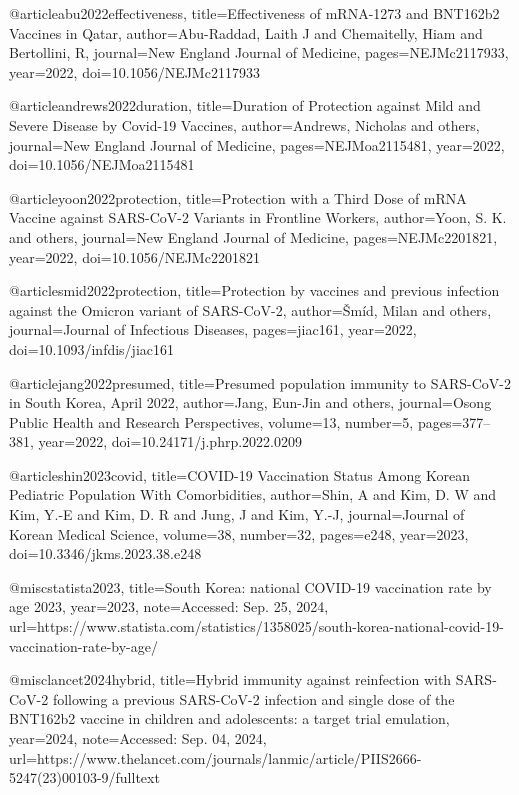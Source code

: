 @article{abu2022effectiveness,
	title={Effectiveness of mRNA-1273 and BNT162b2 Vaccines in Qatar},
	author={Abu-Raddad, Laith J and Chemaitelly, Hiam and Bertollini, R},
	journal={New England Journal of Medicine},
	pages={NEJMc2117933},
	year={2022},
	doi={10.1056/NEJMc2117933}
}

@article{andrews2022duration,
	title={Duration of Protection against Mild and Severe Disease by Covid-19 Vaccines},
	author={Andrews, Nicholas and others},
	journal={New England Journal of Medicine},
	pages={NEJMoa2115481},
	year={2022},
	doi={10.1056/NEJMoa2115481}
}

@article{yoon2022protection,
	title={Protection with a Third Dose of mRNA Vaccine against SARS-CoV-2 Variants in Frontline Workers},
	author={Yoon, S. K. and others},
	journal={New England Journal of Medicine},
	pages={NEJMc2201821},
	year={2022},
	doi={10.1056/NEJMc2201821}
}

@article{smid2022protection,
	title={Protection by vaccines and previous infection against the Omicron variant of SARS-CoV-2},
	author={Šmíd, Milan and others},
	journal={Journal of Infectious Diseases},
	pages={jiac161},
	year={2022},
	doi={10.1093/infdis/jiac161}
}

@article{jang2022presumed,
	title={Presumed population immunity to SARS-CoV-2 in South Korea, April 2022},
	author={Jang, Eun-Jin and others},
	journal={Osong Public Health and Research Perspectives},
	volume={13},
	number={5},
	pages={377--381},
	year={2022},
	doi={10.24171/j.phrp.2022.0209}
}

@article{shin2023covid,
	title={COVID-19 Vaccination Status Among Korean Pediatric Population With Comorbidities},
	author={Shin, A and Kim, D. W and Kim, Y.-E and Kim, D. R and Jung, J and Kim, Y.-J},
	journal={Journal of Korean Medical Science},
	volume={38},
	number={32},
	pages={e248},
	year={2023},
	doi={10.3346/jkms.2023.38.e248}
}

@misc{statista2023,
	title={South Korea: national COVID-19 vaccination rate by age 2023},
	year={2023},
	note={Accessed: Sep. 25, 2024},
	url={https://www.statista.com/statistics/1358025/south-korea-national-covid-19-vaccination-rate-by-age/}
}

@misc{lancet2024hybrid,
	title={Hybrid immunity against reinfection with SARS-CoV-2 following a previous SARS-CoV-2 infection and single dose of the BNT162b2 vaccine in children and adolescents: a target trial emulation},
	year={2024},
	note={Accessed: Sep. 04, 2024},
	url={https://www.thelancet.com/journals/lanmic/article/PIIS2666-5247(23)00103-9/fulltext}
}